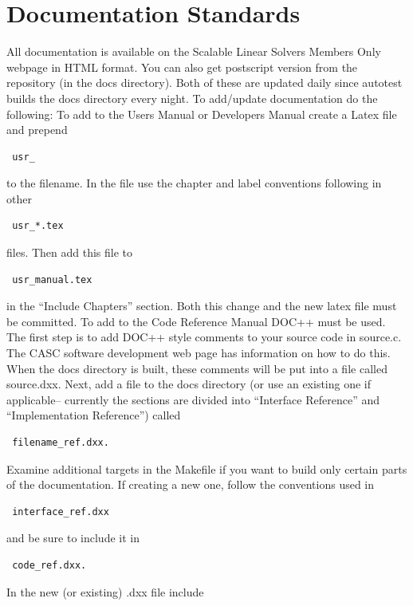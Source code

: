 \chapter{Documentation Standards}
\label{Documentation Standards}

All documentation is available on the Scalable Linear Solvers Members Only
webpage in HTML format.  You can also get postscript version from the
repository (in the docs directory).  Both of these are updated daily since
autotest builds the docs directory every night. 
\newline
To add/update documentation do the following:
\newline
To add to the Users Manual or Developers Manual create a Latex file and
prepend 
\begin{verbatim} usr_ \end{verbatim}
to the 
filename.  In the file use the chapter and label conventions following in
other 
\begin{verbatim} usr_*.tex \end{verbatim} 
files.  Then add this file to 
\begin{verbatim} usr_manual.tex \end{verbatim} 
in the 
``Include Chapters'' section.  Both this change and the new latex
file must be committed.  
\newline\newline
To add to the Code Reference Manual DOC++ must be used.  The first step is
to add DOC++ style comments to your source code in source.c.  The CASC software development web page has information on how to do this.  When the docs 
directory is built, these comments will be put into a file called
source.dxx.  Next, add a file to the docs
directory (or use an existing one if applicable-- currently the sections
are divided into ``Interface Reference'' and ``Implementation Reference'') 
called 
\begin{verbatim} filename_ref.dxx. \end{verbatim} 
Examine additional targets in the Makefile if you want to build only
certain parts of the documentation.  If creating a new one, follow the 
conventions used in \begin{verbatim} interface_ref.dxx \end{verbatim} and be sure to include it in 
\begin{verbatim} code_ref.dxx. \end{verbatim}  
In the new (or existing) .dxx file include 

